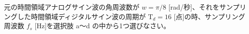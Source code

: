 元の時間領域アナログサイン波の角周波数が $w = \pi/8$ [rad/秒]、それをサンプリングした時間領域ディジタルサイン波の周期が $\textrm{T}_d = 16$ [点]の時、サンプリング周波数 $f_s$ [Hz]を選択肢 a〜d の中から1つ選びなさい。
